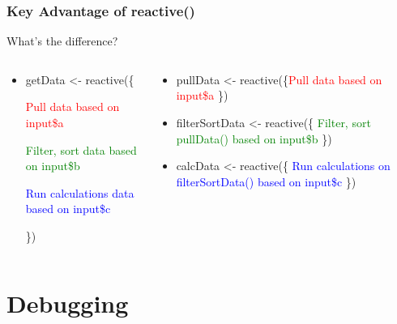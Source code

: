 \documentclass[
	11pt, %
]{beamer}
\begin{document}
\begin{frame}
	\frametitle{Key Advantage of reactive()}	
	
	What's the difference?	
	
	\begin{columns}
    \begin{column}{0.47\textwidth}
    \begin{itemize}        
        \item getData \textless- reactive(\{
        
			\indent \textcolor{red}{Pull data based on input\$a}
			
			\indent \textcolor{green}{Filter, sort data based on input\$b}		        

        	\indent \textcolor{blue}{Run calculations data based on input\$c}
        	
        \})
        \end{itemize}
    \end{column}
    \begin{column}{0.5\textwidth}
       
       \begin{itemize}
       \item pullData \textless- reactive(\{\textcolor{red}{Pull data based on input\$a} \})       
       \item filterSortData \textless- reactive(\{ \textcolor{green}{Filter, sort pullData() based on input\$b} \})       
	   \item calcData \textless- reactive(\{ \textcolor{blue}{Run calculations on filterSortData() based on input\$c} \})
       \end{itemize}       

       
    \end{column}
\end{columns}
	
\end{frame}


\section{Debugging}
\end{document}
